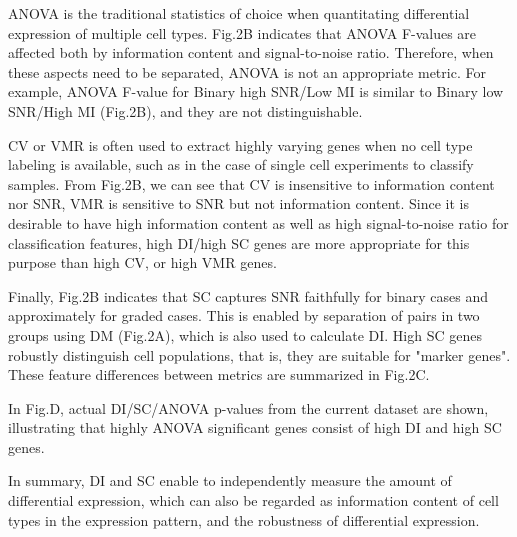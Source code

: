 ANOVA is the traditional statistics of choice when quantitating differential expression of multiple cell types. Fig.2B indicates that ANOVA F-values are affected both by information content and signal-to-noise ratio. Therefore, when these aspects need to be separated, ANOVA is not an appropriate metric. For example, ANOVA F-value for Binary high SNR/Low MI is similar to Binary low SNR/High MI (Fig.2B), and they are not distinguishable. 

CV or VMR is often used to extract highly varying genes when no cell type labeling is available, such as in the case of single cell experiments to classify samples. From Fig.2B, we can see that CV is insensitive to information content nor SNR, VMR is sensitive to SNR but not information content.  Since it is desirable to have high information content as well as high signal-to-noise ratio for classification features, high DI/high SC genes are more appropriate for this purpose than high CV, or high VMR genes. 

Finally, Fig.2B indicates that SC captures SNR faithfully for binary cases and approximately for graded cases. This is enabled by separation of pairs in two groups using DM (Fig.2A), which is also used to calculate DI. High SC genes robustly distinguish cell populations, that is, they are suitable for "marker genes".  These feature differences between metrics are summarized in Fig.2C.

In Fig.D, actual DI/SC/ANOVA p-values from the current dataset are shown, illustrating that highly  ANOVA significant genes consist of high DI and high SC genes. 

In summary, DI and SC enable to independently measure the amount of differential expression, which can also be regarded as information content of cell types in the expression pattern, and the robustness of differential expression.